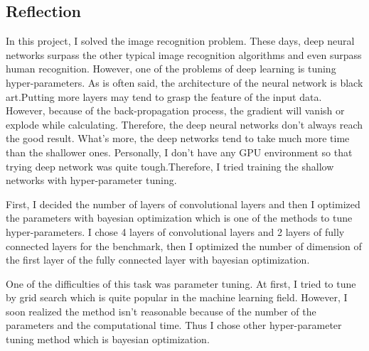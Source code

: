 \subsection{Reflection}


In this project, I solved the image recognition problem. These days, deep neural networks surpass the other typical image recognition algorithms and even surpass human recognition. However, one of the problems of deep learning is tuning hyper-parameters.
As is often said, the architecture of the neural network is black art.Putting more layers may tend to grasp the feature of the input data. However, because of the back-propagation process, the gradient will vanish or explode while calculating. Therefore, the deep neural networks don't always reach the good result. What's more, the deep networks tend to take much more time than the shallower ones. Personally, I don't have any GPU environment so that trying deep network was quite tough.Therefore, I tried training the shallow networks with hyper-parameter tuning. 

First, I decided the number of layers of convolutional layers and then I optimized the parameters with bayesian optimization which is one of the methods to tune hyper-parameters. I chose 4 layers of convolutional layers and 2 layers of fully connected layers for the benchmark, then I optimized the number of dimension of the first layer of the fully connected layer with bayesian optimization. 

One of the difficulties of this task was parameter tuning. At first, I tried to tune by grid search which is quite popular in the machine learning field. However, I soon realized the method isn't reasonable because of the number of the parameters and the computational time. Thus I chose other hyper-parameter tuning method which is bayesian optimization.
